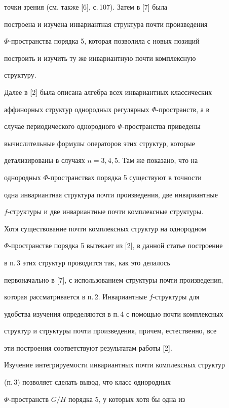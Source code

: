 точки зрения (см. также [6], с.\,107). Затем в [7] была


построена и изучена инвариантная структура почти произведения


$\Phi$-пространства порядка 5, которая позволила с новых позиций


построить и изучить ту же инвариантную почти комплексную


структуру.





Далее в [2] была описана алгебра всех инвариантных классических


аффинорных структур однородных регулярных $\Phi$-пространств, а в


случае периодического однородного $\Phi$-пространства приведены


вычислительные формулы операторов этих структур, которые


детализированы в случаях $n=3,4,5$. Там же показано, что на


однородных $\Phi$-пространствах порядка 5 существуют в точности


одна инвариантная структура почти произведения, две инвариантные


$f$-структуры и две инвариантные почти комплексные структуры.





Хотя существование почти комплексных структур на однородном


$\Phi$-пространстве порядка 5 вытекает из [2], в данной статье построение


в п.\,3 этих структур проводится так, как это делалось


первоначально в [7], с использованием структуры почти произведения,


которая рассматривается в п.\,2. Инвариантные $f$-структуры для


удобства изучения определяются в п.\,4 с помощью почти комплексных


структур и структуры почти произведения, причем, естественно, все


эти построения соответствуют результатам работы [2].





Изучение интегрируемости инвариантных почти комплексных структур


(п.\,3) позволяет сделать вывод, что класс однородных


$\Phi$-пространств $G/H$ порядка 5, у которых хотя бы одна из


